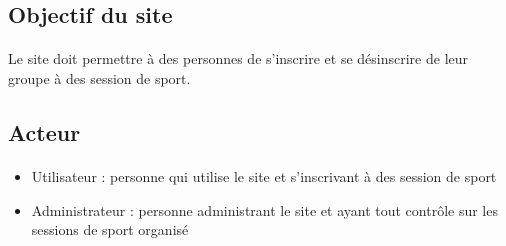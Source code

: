 
\subsection{Objectif du site}
	\paragraph{}
		Le site doit permettre à des personnes de s’inscrire et se désinscrire de leur groupe à des session de sport. 
		
		
\subsection{Acteur}
	\paragraph{}
		\begin{itemize}
			\item Utilisateur : personne qui utilise le site et s'inscrivant à des session de sport
			\item Administrateur : personne administrant le site et ayant tout contrôle sur les sessions de sport organisé
		\end{itemize}
		

